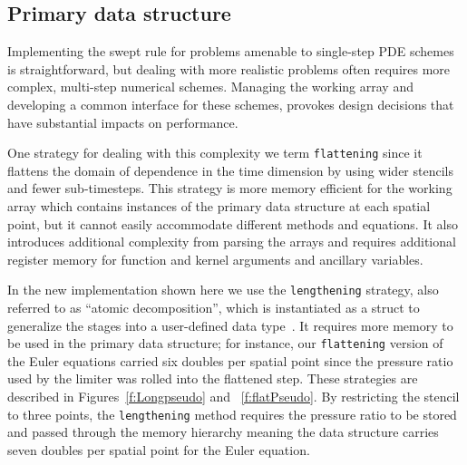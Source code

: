 \subsection{Primary data structure} \label{sec:hPrimaryData}

Implementing the swept rule for problems amenable to single-step PDE schemes is straightforward,
but dealing with more realistic problems often requires more complex, multi-step numerical schemes.
Managing the working array and developing a common interface for these schemes, provokes design decisions that have substantial impacts on performance.

One strategy for dealing with this complexity we term \texttt{flattening} since it flattens the domain of dependence in the time dimension by using wider stencils and fewer sub-timesteps. 
This strategy is more memory efficient for the working array which contains instances of the primary data structure at each spatial point, but it cannot easily accommodate different methods and equations.
It also introduces additional complexity from parsing the arrays and requires additional register memory for function and kernel arguments and ancillary variables.

In the new implementation shown here we use the \texttt{lengthening} strategy, also referred to as ``atomic decomposition'', which is instantiated as a struct to generalize the stages into a user-defined data type~\cite{WangDecomp}.
It requires more memory to be used in the primary data structure; for instance, our \texttt{flattening} version of the Euler equations carried six doubles per spatial point since the pressure ratio used by the limiter was rolled into the flattened step.
These strategies are described in Figures~\ref{f:Longpseudo} and ~\ref{f:flatPseudo}. 
By restricting the stencil to three points, the \texttt{lengthening} method requires the pressure ratio to be stored and passed through the memory hierarchy meaning the data structure carries seven doubles per spatial point for the Euler equation.

